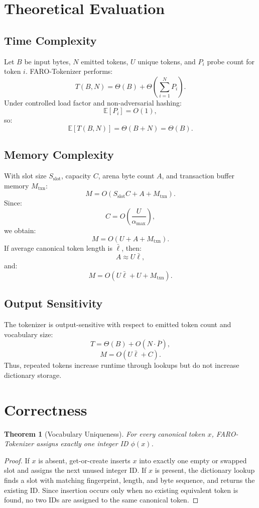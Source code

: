 \documentclass[11pt,a4paper]{article}
\newtheorem{theorem}{Theorem}
\begin{document}
\section{Theoretical Evaluation}

\subsection{Time Complexity}

Let \(B\) be input bytes, \(N\) emitted tokens, \(U\) unique tokens, and \(P_i\) probe count for token \(i\). FARO-Tokenizer performs:
\[
T(B,N)=\Theta(B)+\Theta\left(\sum_{i=1}^{N}P_i\right).
\]
Under controlled load factor and non-adversarial hashing:
\[
\mathbb{E}[P_i]=O(1),
\]
so:
\[
\mathbb{E}[T(B,N)]=\Theta(B+N)=\Theta(B).
\]

\subsection{Memory Complexity}

With slot size \(S_{\text{slot}}\), capacity \(C\), arena byte count \(A\), and transaction buffer memory \(M_{\text{txn}}\):
\[
M=O(S_{\text{slot}}C+A+M_{\text{txn}}).
\]
Since:
\[
C=O\left(\frac{U}{\alpha_{\max}}\right),
\]
we obtain:
\[
M=O(U+A+M_{\text{txn}}).
\]
If average canonical token length is \(\bar{\ell}\), then:
\[
A\approx U\bar{\ell},
\]
and:
\[
M=O(U\bar{\ell}+U+M_{\text{txn}}).
\]

\subsection{Output Sensitivity}

The tokenizer is output-sensitive with respect to emitted token count and vocabulary size:
\[
T=\Theta(B)+O(N\cdot \bar{P}),
\]
\[
M=O(U\bar{\ell}+C).
\]
Thus, repeated tokens increase runtime through lookups but do not increase dictionary storage.

\section{Correctness}

\begin{theorem}[Vocabulary Uniqueness]
For every canonical token \(x\), FARO-Tokenizer assigns exactly one integer ID \(\phi(x)\).
\end{theorem}

\begin{proof}
If \(x\) is absent, get-or-create inserts \(x\) into exactly one empty or swapped slot and assigns the next unused integer ID. If \(x\) is present, the dictionary lookup finds a slot with matching fingerprint, length, and byte sequence, and returns the existing ID. Since insertion occurs only when no existing equivalent token is found, no two IDs are assigned to the same canonical token.
\end{proof}
\end{document}
